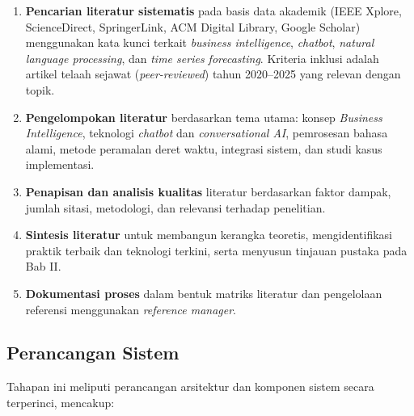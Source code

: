 \begin{enumerate}[label=\alph*.]
  \item \textbf{Pencarian literatur sistematis} pada basis data akademik (IEEE Xplore, ScienceDirect, SpringerLink, ACM Digital Library, Google Scholar) menggunakan kata kunci terkait \textit{business intelligence}, \textit{chatbot}, \textit{natural language processing}, dan \textit{time series forecasting}. Kriteria inklusi adalah artikel telaah sejawat (\textit{peer-reviewed}) tahun 2020--2025 yang relevan dengan topik.
  
  \item \textbf{Pengelompokan literatur} berdasarkan tema utama: konsep \textit{Business Intelligence}, teknologi \textit{chatbot} dan \textit{conversational AI}, pemrosesan bahasa alami, metode peramalan deret waktu, integrasi sistem, dan studi kasus implementasi.
  
  \item \textbf{Penapisan dan analisis kualitas} literatur berdasarkan faktor dampak, jumlah sitasi, metodologi, dan relevansi terhadap penelitian.
  
  \item \textbf{Sintesis literatur} untuk membangun kerangka teoretis, mengidentifikasi praktik terbaik dan teknologi terkini, serta menyusun tinjauan pustaka pada Bab II.
  
  \item \textbf{Dokumentasi proses} dalam bentuk matriks literatur dan pengelolaan referensi menggunakan \textit{reference manager}.
\end{enumerate}

\subsection{Perancangan Sistem}

Tahapan ini meliputi perancangan arsitektur dan komponen sistem secara terperinci, mencakup:


